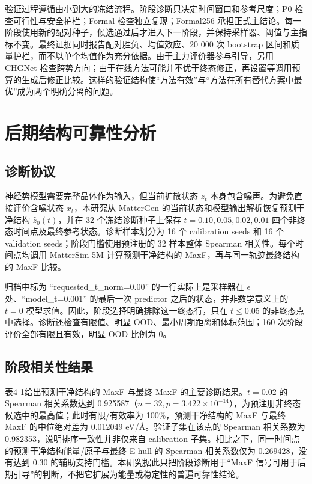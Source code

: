 验证过程遵循由小到大的冻结流程。阶段诊断只决定时间窗口和参考尺度；P0 检查可行性与安全护栏；Formal 检查独立复现；Formal256 承担正式主结论。每一阶段使用新的配对种子，候选通过后才进入下一阶段，并保持采样器、阈值与主指标不变。最终证据同时报告配对胜负、均值效应、20 000 次 bootstrap 区间和质量护栏，而不以单个均值作为充分依据。由于主力评价器参与引导，另用 CHGNet 检查跨势方向；由于在线方法可能并不优于终态修正，再设置等调用预算的生成后修正比较。这样的验证结构使``方法有效''与``方法在所有替代方案中最优''成为两个明确分离的问题。

\section{后期结构可靠性分析}

\subsection{诊断协议}

神经势模型需要完整晶体作为输入，但当前扩散状态 \(z_t\) 本身包含噪声。为避免直接评价含噪状态 \(x_t\)，本研究从 MatterGen 的当前状态和模型输出解析恢复预测干净结构 \(\widehat z_0(t)\)，并在 32 个冻结诊断种子上保存 \(t=0.10,0.05,0.02,0.01\) 四个非终态时间点及最终参考状态。诊断样本划分为 16 个 calibration seeds 和 16 个 validation seeds；阶段门槛使用预注册的 32 样本整体 Spearman 相关性。每个时间点均调用 Matter\allowbreak Sim-5M 计算预测干净结构的 MaxF，再与同一轨迹最终结构的 MaxF 比较。

归档中标为 ``requested\_t\_norm=0.00'' 的一行实际上是采样器在 \(\epsilon\) 处、``model\_t=0.001'' 的最后一次 predictor 之后的状态，并非数学意义上的 \(t=0\) 模型求值。因此，阶段选择明确排除这一终态行，只在 \(t\leq0.05\) 的非终态点中选择。诊断还检查有限值、明显 OOD、最小周期距离和体积范围；160 次阶段评价全部有限且有效，明显 OOD 比例为 0。

\subsection{阶段相关性结果}

表4-1给出预测干净结构的 MaxF 与最终 MaxF 的主要诊断结果。\(t=0.02\) 的 Spearman 相关系数达到 0.925587（\(n=32,p=3.422\times10^{-14}\)），为预注册非终态候选中的最高值；此时有限/有效率为 100\%，预测干净结构的 MaxF 与最终 MaxF 的中位绝对差为 0.012049 eV/Å。验证子集在该点的 Spearman 相关系数为 0.982353，说明排序一致性并非仅来自 calibration 子集。相比之下，同一时间点的预测干净结构能量/原子与最终 E-hull 的 Spearman 相关系数仅为 0.269428，没有达到 0.30 的辅助支持门槛。本研究据此只把阶段诊断用于``MaxF 信号可用于后期引导''的判断，不把它扩展为能量或稳定性的普遍可靠性结论。



